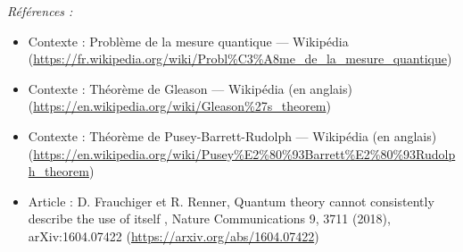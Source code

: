 \documentclass[11pt]{article}
\newenvironment{refs}{\par\small\noindent\emph{Références :}\begin{itemize}\setlength\itemsep{0pt}}{\end{itemize}\normalsize}
\begin{document}
\begin{refs}
\item Contexte : Problème de la mesure quantique --- Wikipédia (\url{https://fr.wikipedia.org/wiki/Probl%C3%A8me_de_la_mesure_quantique})
\item Contexte : Théorème de Gleason --- Wikipédia (en anglais) (\url{https://en.wikipedia.org/wiki/Gleason%27s_theorem})
\item Contexte : Théorème de Pusey-Barrett-Rudolph --- Wikipédia (en anglais) (\url{https://en.wikipedia.org/wiki/Pusey%E2%80%93Barrett%E2%80%93Rudolph_theorem})
\item Article : D. Frauchiger et R. Renner, \og{} Quantum theory cannot consistently describe the use of itself \fg{}, Nature Communications 9, 3711 (2018), arXiv:1604.07422 (\url{https://arxiv.org/abs/1604.07422})
\end{refs}

\bigskip
\end{document}
